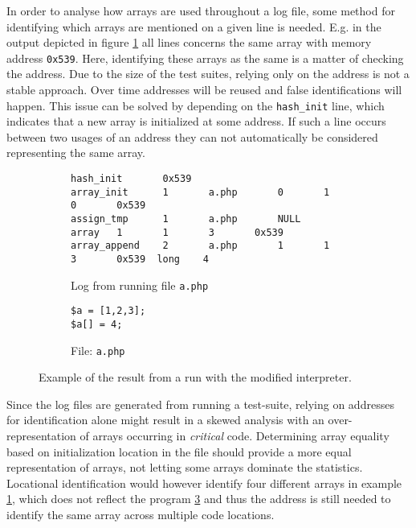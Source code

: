 In order to analyse how arrays are used throughout a log file, some method for identifying which arrays are mentioned on a given line is needed. E.g. in the output depicted in figure \ref{lst:id_array_code_out} all lines concerns the same array with memory address \texttt{0x539}. Here, identifying these arrays as the same is a matter of checking the address. Due to the size of the test suites, relying only on the address is not a stable approach. Over time addresses will be reused and false identifications will happen. This issue can be solved by depending on the \texttt{hash\_init} line, which indicates that a new array is initialized at some address. If such a line occurs between two usages of an address they can not automatically be considered representing the same array. 
\begin{figure}
\centering
\begin{subfigure}{\textwidth}
\begin{lstlisting}[mathescape, deletekeywords={array},basicstyle=\tiny]
hash_init       0x539
array_init      1       a.php       0       1       0       0x539
assign_tmp      1       a.php       NULL    array   1       1       3       0x539
array_append    2       a.php       1       1       3       0x539  long    4
\end{lstlisting}
\caption{Log from running file \texttt{a.php}}
\label{lst:id_array_code_out}
\end{subfigure}
\begin{subfigure}{\textwidth}
\begin{lstlisting}
$a = [1,2,3];
$a[] = 4;
\end{lstlisting}
\caption{File: \texttt{a.php}}
\label{lst:id_array_code}
\end{subfigure}
\caption{Example of the result from a run with the modified interpreter.}
\end{figure}

Since the log files are generated from running a test-suite, relying on addresses for identification alone might result in a skewed analysis with an over-representation of arrays occurring in \emph{critical} code. Determining array equality based on initialization location in the file should provide a more equal representation of arrays, not letting some arrays dominate the statistics. Locational identification would however identify four different arrays in example \ref{lst:id_array_code_out}, which does not reflect the program \ref{lst:id_array_code} and thus the address is still needed to identify the same array across multiple code locations.


